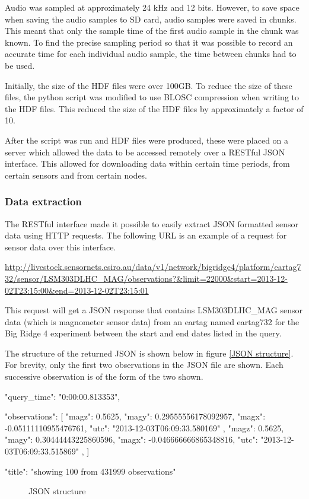 Audio was sampled at approximately 24 kHz and 12 bits. However, to save space when saving the audio samples to SD card, audio samples were saved in chunks. This meant that only the sample time of the first audio sample in the chunk was known. To find the precise sampling period so that it was possible to record an accurate time for each individual audio sample, the time between chunks had to be used.  

Initially, the size of the HDF files were over 100GB. To reduce the size of these files, the python script was modified to use BLOSC compression when writing to the HDF files. This reduced the size of the HDF files by approximately a factor of 10.

After the script was run and HDF files were produced, these were placed on a server which allowed the data to be accessed remotely over a RESTful JSON interface. This allowed for downloading data within certain time periods, from certain sensors and from certain nodes. 

\subsubsection{Data extraction}
\label{extraction}
The RESTful interface made it possible to easily extract JSON formatted sensor data using HTTP requests. The following URL is an example of a request for sensor data over this interface. 

\url{http://livestock.sensornets.csiro.au/data/v1/network/bigridge4/platform/eartag732/sensor/LSM303DLHC\_MAG/observations?\&limit=22000\&start=2013-12-02T23:15:00\&end=2013-12-02T23:15:01} 

This request will get a JSON response that contains LSM303DLHC\_MAG sensor data (which is magnometer sensor data) from an eartag named eartag732 for the Big Ridge 4 experiment between the start and end dates listed in the query. 

The structure of the returned JSON is shown below in figure \ref{JSON structure}. For brevity, only the first two observations in the JSON file are shown. Each successive observation is of the form of the two shown. 

\begin{verbbox}
{
    "query_time": "0:00:00.813353",

    "observations": [
            {
                "magz": 0.5625,
                "magy": 0.29555556178092957,
                "magx": -0.05111110955476761,
                "utc": "2013-12-03T06:09:33.580169"
            },
            {
                "magz": 0.5625,
                "magy": 0.30444443225860596,
                "magx": -0.046666666865348816,
                "utc": "2013-12-03T06:09:33.515869"
            },
        ]

    "title": "showing 100 from 431999 observations"
}
\end{verbbox}
\begin{figure}[ht!]
  \centering
  \theverbbox
  \caption{JSON structure}
\end{figure}

